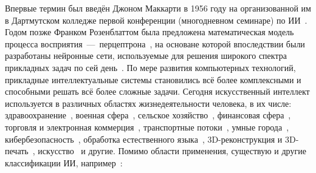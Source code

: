 Впервые термин был введён Джоном Маккарти в 1956 году на организованной им в Дартмутском колледже первой конференции (многодневном семинаре) по ИИ~\cite{osipov}. Годом позже Франком Розенблаттом была предложена математическая модель процесса восприятия~---~перцептрона~\cite{rosenblatt}, на основане которой впоследствии были разработаны нейронные сети, используемые для решения широкого спектра прикладных задач по сей день~\cite{skansi, nikolenko, trask, goodfellow, sharifani, sarkerdl}. По мере развития компьютерных технологий, прикладные интеллектуальные системы становились всё более комплексными и способными решать всё более сложные задачи. Сегодня искусственный интеллект используется в различных областях жизнедеятельности человека, в их числе: здравоохранение~\cite{glicksberg, awasthi, kitsios, elyan}, военная сфера~\cite{morgan, elmokadem}, сельское хозяйство~\cite{oliveira, bhagat, padhiary, wang}, финансовая сфера~\cite{bahoo, weber, shiyyab, shabsigh}, торговля и электронная коммерция~\cite{bawack, goti, ziakis}, транспортные потоки~\cite{sayed, jiang, mushtaq, loce}, умные города~\cite{wolniak, podda, zamponi, fekriershad}, кибербезопасность~\cite{malatji, ramanpreet, polito}, обработка естественного языка~\cite{zubiaga, khurana, alqahtani}, 3D-реконструкция и 3D-печать~\cite{petsiuk, ham}, искусство~\cite{zhou, oksanen, watiktinnakorn} и другие. Помимо области применения, существую и другие классификации ИИ, например~\cite{russell}:
